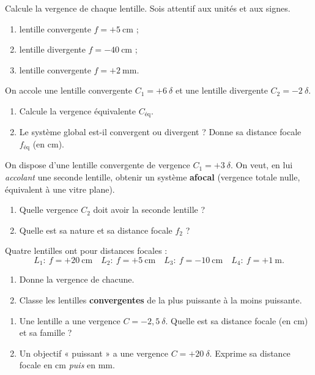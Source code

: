 \documentclass[11pt,a4paper]{article}
\begin{document}

\begin{exo}
Calcule la vergence de chaque lentille. Sois attentif aux unités et aux signes.
\begin{enumerate}[label=\alph*)]
  \item lentille convergente $f=+\qty{5}{\cm}$ ;
  \item lentille divergente $f=-\qty{40}{\cm}$ ;
  \item lentille convergente $f=+\qty{2}{\mm}$.
\end{enumerate}
\end{exo}

\begin{exo}
On accole une lentille convergente $C_1=+6~\delta$ et une lentille divergente $C_2=-2~\delta$.
\begin{enumerate}[label=\alph*)]
  \item Calcule la vergence équivalente $C_{\text{éq}}$.
  \item Le système global est-il convergent ou divergent ? Donne sa distance focale $f_{\text{éq}}$
        (en cm).
\end{enumerate}
\end{exo}

\begin{exo}
On dispose d'une lentille convergente de vergence $C_1=+3~\delta$. On veut, en lui \emph{accolant} une
seconde lentille, obtenir un système \textbf{afocal} (vergence totale nulle, équivalent à une vitre
plane).
\begin{enumerate}[label=\alph*)]
  \item Quelle vergence $C_2$ doit avoir la seconde lentille ?
  \item Quelle est sa nature et sa distance focale $f_2$ ?
\end{enumerate}
\end{exo}

\begin{exo}
Quatre lentilles ont pour distances focales :
\[ L_1:\ f=+\qty{20}{\cm}\quad L_2:\ f=+\qty{5}{\cm}\quad L_3:\ f=-\qty{10}{\cm}\quad L_4:\ f=+\qty{1}{\m}. \]
\begin{enumerate}[label=\alph*)]
  \item Donne la vergence de chacune.
  \item Classe les lentilles \textbf{convergentes} de la plus puissante à la moins puissante.
\end{enumerate}
\end{exo}

\begin{exo}
\begin{enumerate}[label=\alph*)]
  \item Une lentille a une vergence $C=-2{,}5~\delta$. Quelle est sa distance focale (en cm) et sa
        famille ?
  \item Un objectif « puissant » a une vergence $C=+20~\delta$. Exprime sa distance focale en cm
        \emph{puis} en mm.
\end{enumerate}
\end{exo}
\end{document}
